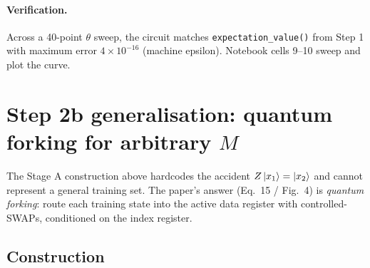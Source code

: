 \documentclass[11pt,a4paper]{article}
\begin{document}
\paragraph{Verification.} Across a 40-point $\theta$ sweep, the circuit
matches \texttt{expectation\_value()} from Step 1 with maximum error
$4 \times 10^{-16}$ (machine epsilon). Notebook cells 9--10 sweep and plot
the curve.

\section{Step 2b generalisation: quantum forking for arbitrary $M$}
\label{sec:forking}

The Stage A construction above hardcodes the accident
$Z\ket{x_1} = \ket{x_2}$ and cannot represent a general training set. The
paper's answer (Eq.~15 / Fig.~4) is \emph{quantum forking}: route each
training state into the active data register with controlled-SWAPs,
conditioned on the index register.

\subsection{Construction}
\end{document}
